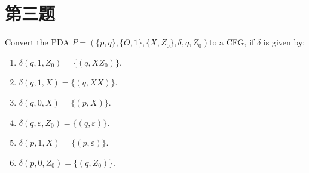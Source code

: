 \documentclass[12pt,onecolumn]{article}
\theoremstyle{plain}
\begin{document}
\section{第三题}
Convert the PDA $P = (\{p,q\},\{O,1\},\{X,Z_0\},δ,q,Z_0)$to a CFG,
if $\delta$  is given by:
\begin{enumerate}[fullwidth,itemindent=\parindent,label=(\arabic*)]
 \item $\delta(q,1,Z_0) = \{(q,XZ_0)\}$.
 \item $\delta(q,1,X) = \{(q,XX)\}$.
 \item $\delta(q,0,X) = \{(p,X)\}$.
 \item $\delta(q,ε, Z_0) = \{(q, \varepsilon)\}$.
 \item $\delta(p,1,X) = \{(p, \varepsilon)\}$.
 \item $\delta(p,0,Z_0) = \{(q, Z_0)\}$.
\end{enumerate}
\end{document}
